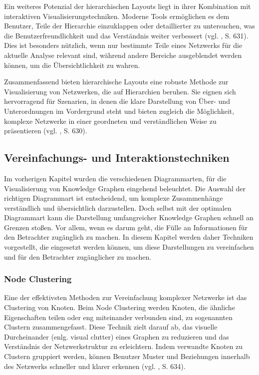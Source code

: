 Ein weiteres Potenzial der hierarchischen Layouts liegt in ihrer Kombination mit interaktiven Visualisierungstechniken. Moderne Tools ermöglichen es dem Benutzer, Teile der Hierarchie einzuklappen oder detaillierter zu untersuchen, was die Benutzerfreundlichkeit und das Verständnis weiter verbessert (vgl. \cite{chen:SurveyGraphVisualization}, S. 631). Dies ist besonders nützlich, wenn nur bestimmte Teile eines Netzwerks für die aktuelle Analyse relevant sind, während andere Bereiche ausgeblendet werden können, um die Übersichtlichkeit zu wahren.

Zusammenfassend bieten hierarchische Layouts eine robuste Methode zur Visualisierung von Netzwerken, die auf Hierarchien beruhen. Sie eignen sich hervorragend für Szenarien, in denen die klare Darstellung von Über- und Unterordnungen im Vordergrund steht und bieten zugleich die Möglichkeit, komplexe Netzwerke in einer geordneten und verständlichen Weise zu präsentieren (vgl. \cite{chen:SurveyGraphVisualization}, S. 630).

\subsection{Vereinfachungs- und Interaktionstechniken}

Im vorherigen Kapitel wurden die verschiedenen Diagrammarten, für die Visualisierung von Knowledge Graphen eingehend beleuchtet. Die Auswahl der richtigen Diagrammart ist entscheidend, um komplexe Zusammenhänge verständlich und übersichtlich darzustellen. Doch selbst mit der optimalen Diagrammart kann die Darstellung umfangreicher Knowledge Graphen schnell an Grenzen stoßen. Vor allem, wenn es darum geht, die Fülle an Informationen für den Betrachter zugänglich zu machen. In diesem Kapitel werden daher Techniken vorgestellt, die eingesetzt werden können, um diese Darstellungen zu vereinfachen und für den Betrachter zugänglicher zu machen.

\subsubsection{Node Clustering}

Eine der effektivsten Methoden zur Vereinfachung komplexer Netzwerke ist das Clustering von Knoten. Beim Node Clustering werden Knoten, die ähnliche Eigenschaften teilen oder eng miteinander verbunden sind, zu sogenannten Clustern zusammengefasst. Diese Technik zielt darauf ab, das visuelle Durcheinander (enlg. visual clutter) eines Graphen zu reduzieren und das Verständnis der Netzwerkstruktur zu erleichtern. Indem verwandte Knoten zu Clustern gruppiert werden, können Benutzer Muster und Beziehungen innerhalb des Netzwerks schneller und klarer erkennen (vgl. \cite{chen:SurveyGraphVisualization}, S. 634).

